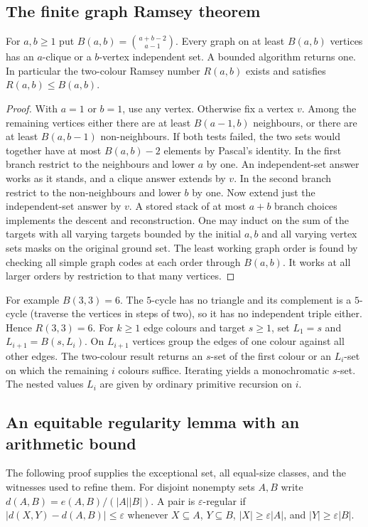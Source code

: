 \subsection{The finite graph Ramsey theorem}
\begin{theorem}\leavevmode\label{co:ramsey}
For $a,b\ge1$ put $B(a,b)=\binom{a+b-2}{a-1}$. Every graph on at
least $B(a,b)$ vertices has an $a$-clique or a $b$-vertex independent
set. A bounded algorithm returns one. In particular the two-colour Ramsey
number $R(a,b)$ exists and satisfies $R(a,b)\le B(a,b)$.
\end{theorem}
\begin{proof}
With $a=1$ or $b=1$, use any vertex. Otherwise fix a vertex $v$. Among the
remaining vertices either there are at least $B(a-1,b)$ neighbours, or
there are at least $B(a,b-1)$ non-neighbours. If both tests failed, the two
sets would together have at most $B(a,b)-2$ elements by Pascal's identity.
In the first branch restrict to the neighbours and lower $a$ by one.
An independent-set answer works as it stands, and a clique answer extends
by $v$. In the second branch restrict to the non-neighbours and lower $b$
by one. Now extend just the independent-set answer by $v$. A stored stack
of at most $a+b$ branch choices implements the descent and reconstruction.
One may induct on the sum of the targets with all varying targets bounded
by the initial $a,b$ and all varying vertex sets masks on the original
ground set. The least working graph order is found by checking all simple
graph codes at each order through $B(a,b)$. It works at all larger orders
by restriction to that many vertices.
\end{proof}
For example $B(3,3)=6$. The $5$-cycle has no triangle and its complement
is a $5$-cycle (traverse the vertices in steps of two), so it has no
independent triple either. Hence $R(3,3)=6$. For $k\ge1$ edge colours
and target $s\ge1$, set $L_1=s$ and $L_{i+1}=B(s,L_i)$. On $L_{i+1}$
vertices group the edges of one colour against all other edges. The
two-colour result returns an $s$-set of the first colour or an $L_i$-set
on which the remaining $i$ colours suffice. Iterating yields a
monochromatic $s$-set. The nested values $L_i$ are given by ordinary
primitive recursion on $i$.

\subsection{An equitable regularity lemma with an arithmetic bound}
The following proof supplies the exceptional set, all equal-size classes,
and the witnesses used to refine them. For disjoint nonempty sets $A,B$
write $d(A,B)=e(A,B)/(|A||B|)$. A pair is $\varepsilon$-regular if
$|d(X,Y)-d(A,B)|\le\varepsilon$ whenever $X\subseteq A$, $Y\subseteq B$,
$|X|\ge\varepsilon|A|$, and $|Y|\ge\varepsilon|B|$.

